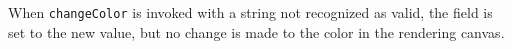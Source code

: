 When \verb|changeColor| is invoked with a string not recognized as
valid, the field is set to the new value, but no change is made to the
color in the rendering canvas.
